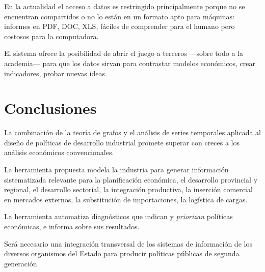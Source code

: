 \documentclass[a4paper]{report}
\begin{document}
En la actualidad el acceso a datos es restringido principalmente porque no se encuentran compartidos o no lo están en un formato apto para máquinas: informes en PDF, DOC, XLS, fáciles de comprender para el humano pero costosos para la computadora.

El sistema ofrece la posibilidad de abrir el juego a terceros —sobre todo a la academia— para que los datos sirvan para contrastar modelos económicos, crear indicadores, probar nuevas ideas.

\section*{Conclusiones}


La combinación de la teoría de grafos y el análisis de series temporales aplicada al diseño de políticas de desarrollo industrial promete superar con creces a los análisis económicos convencionales.

La herramienta propuesta modela la industria para generar información sistematizada relevante para la planificación económica, el desarrollo provincial y regional, el desarrollo sectorial, la integración productiva, la inserción comercial en mercados externos, la substitución de importaciones, la logística de cargas.

La herramienta automatiza diagnósticos que indican y \textit{priorizan} políticas económicas, e informa sobre sus resultados.

Será necesario una integración transversal de los sistemas de información de los diversos organismos del Estado para producir políticas públicas de segunda generación.
\end{document}
